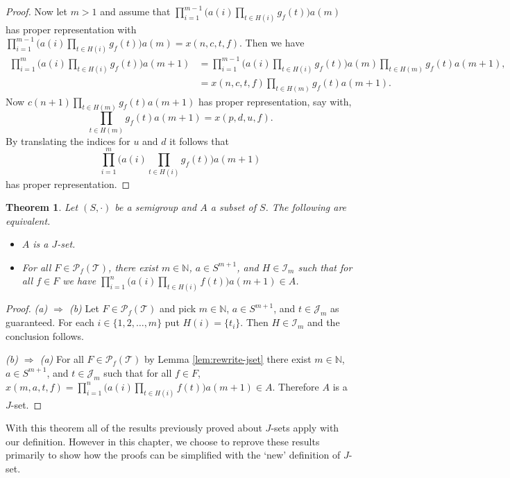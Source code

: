 \documentclass[12pt,showtrims]{memoir}
\theoremstyle{plain}
\newtheorem{thm}{Theorem}[section]
\theoremstyle{definition}
\newcommand{\bbN}{\mathbb{N}}
\newcommand{\calI}{\mathcal{I}}
\newcommand{\calJ}{\mathcal{J}}
\newcommand{\calT}{\mathcal{T}}
\newcommand{\Pf}{\mathcal{P}_f}
\begin{document}
\begin{proof}
  Now let $m > 1$ and assume that $\prod_{i=1}^{m-1} \bigl( a(i) \prod_{t \in H(i)} g_f(t) \bigr) a(m)$ has proper representation with $\prod_{i=1}^{m-1} \bigl( a(i) \prod_{t \in H(i)} g_f(t) \bigr) a(m) = x(n, c, t, f)$. 
  Then we have 
  \begin{align*}
    \textstyle
    \prod_{i=1}^{m} \bigl( a(i) \prod_{t \in H(i)} g_f(t) \bigr) a(m+1) &= \textstyle
    \prod_{i=1}^{m-1} \bigl( a(i) \prod_{t \in H(i)} g_f(t) \bigr) a(m) \prod_{t \in H(m)} g_f(t) a(m+1), \\
    &= \textstyle 
    x(n, c, t, f) \prod_{t \in H(m)} g_f(t) a(m+1).
  \end{align*}
  Now $c(n+1) \prod_{t \in H(m)} g_f(t) a(m+1)$ has proper representation, say with, 
  \[
    \textstyle
    \prod_{t \in H(m)} g_f(t) a(m+1) = x(p, d, u, f).
  \]
  By translating the indices for $u$ and $d$ it follows that 
  \[
    \textstyle
    \prod_{i=1}^{m} \bigl( a(i) \prod_{t \in H(i)} g_f(t) \bigr) a(m+1)
  \]
  has proper representation.
\end{proof}

\begin{thm}
  Let $(S, \cdot)$ be a semigroup and $A$ a subset of $S$.
  The following are equivalent. 
  \begin{itemize}
    \item[(a)] $A$ is a $J$-set.
    \item[(b)] For all $F \in \Pf(\calT)$, there exist $m \in \bbN$, $a \in S^{m+1}$, and $H \in \calI_m$ such that for all $f \in F$ we have $\prod_{i=1}^n\bigl( a(i) \prod_{t \in H(i)} f(t) \bigr) a(m+1) \in A$.
  \end{itemize}
\end{thm}
\begin{proof}
  \textsl{(a) $\Rightarrow$ (b)}
  Let $F \in \Pf(\calT)$ and pick $m \in \bbN$, $a \in S^{m+1}$, and $t \in \calJ_m$ as guaranteed. 
  For each $i \in \{1, 2, \ldots, m\}$ put $H(i) = \{ t_i\}$. 
  Then $H \in \calI_m$ and the conclusion follows. 

  \textsl{(b) $\Rightarrow$ (a)}
  For all $F \in \Pf(\calT)$ by Lemma \ref{lem:rewrite-jset} there exist $m \in \bbN$, $a \in S^{m+1}$, and $t \in \calJ_m$ such that for all $f \in F$, $x(m, a, t, f) = \prod_{i=1}^n\bigl(a(i)\prod_{t \in H(i)} f(t)\bigr)a(m+1) \in A$.
  Therefore $A$ is a $J$-set.
\end{proof}

With this theorem all of the results previously proved about $J$-sets apply  with our definition.
However in this chapter, we choose to reprove these results primarily to show how the proofs can be simplified with the `new' definition of $J$-set.
\end{document}
